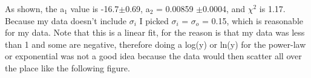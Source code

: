 \documentclass{article}
\begin{document}
\begin{figure}[H]
\end{figure}
As shown, the a$_1$ value is -16.7$\pm$0.69, a$_2$ = 0.00859 $\pm$0.0004, and $\chi ^2$ is 1.17. Because my data doesn't include $\sigma_i$ I picked $\sigma_i$ = $\sigma_o$ = 0.15, which is reasonable for my data. Note that this is a linear fit, for the reason is that my data was less than 1 and some are negative, therefore doing a log(y) or ln(y) for the power-law or exponential was not a good idea because the data would then scatter all over the place like the following figure.
\begin{figure}[H]
\end{figure}
\end{document}
